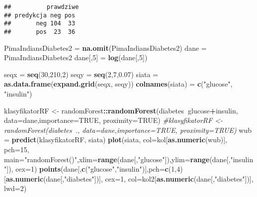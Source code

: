 \documentclass[polish,]{book}
\newenvironment{Shaded}{\begin{snugshade}}{\end{snugshade}}
\newcommand{\CommentTok}[1]{\textcolor[rgb]{0.56,0.35,0.01}{\textit{#1}}}
\newcommand{\DataTypeTok}[1]{\textcolor[rgb]{0.13,0.29,0.53}{#1}}
\newcommand{\DecValTok}[1]{\textcolor[rgb]{0.00,0.00,0.81}{#1}}
\newcommand{\FloatTok}[1]{\textcolor[rgb]{0.00,0.00,0.81}{#1}}
\newcommand{\KeywordTok}[1]{\textcolor[rgb]{0.13,0.29,0.53}{\textbf{#1}}}
\newcommand{\NormalTok}[1]{#1}
\newcommand{\OperatorTok}[1]{\textcolor[rgb]{0.81,0.36,0.00}{\textbf{#1}}}
\newcommand{\OtherTok}[1]{\textcolor[rgb]{0.56,0.35,0.01}{#1}}
\newcommand{\StringTok}[1]{\textcolor[rgb]{0.31,0.60,0.02}{#1}}
\begin{document}
\begin{verbatim}
##          prawdziwe
## predykcja neg pos
##       neg 104  33
##       pos  23  36
\end{verbatim}

\begin{Shaded}
\begin{Highlighting}[]
\NormalTok{PimaIndiansDiabetes2 =}\StringTok{ }\KeywordTok{na.omit}\NormalTok{(PimaIndiansDiabetes2)}
\NormalTok{dane =}\StringTok{ }\NormalTok{PimaIndiansDiabetes2}
\NormalTok{dane[,}\DecValTok{5}\NormalTok{] =}\StringTok{ }\KeywordTok{log}\NormalTok{(dane[,}\DecValTok{5}\NormalTok{])}

\NormalTok{seqx =}\StringTok{ }\KeywordTok{seq}\NormalTok{(}\DecValTok{30}\NormalTok{,}\DecValTok{210}\NormalTok{,}\DecValTok{2}\NormalTok{)}
\NormalTok{seqy =}\StringTok{ }\KeywordTok{seq}\NormalTok{(}\DecValTok{2}\NormalTok{,}\DecValTok{7}\NormalTok{,}\FloatTok{0.07}\NormalTok{)}
\NormalTok{siata =}\StringTok{ }\KeywordTok{as.data.frame}\NormalTok{(}\KeywordTok{expand.grid}\NormalTok{(seqx, seqy))}
\KeywordTok{colnames}\NormalTok{(siata) =}\StringTok{ }\KeywordTok{c}\NormalTok{(}\StringTok{"glucose"}\NormalTok{, }\StringTok{"insulin"}\NormalTok{)}

\NormalTok{klasyfikatorRF <-}\StringTok{ }\NormalTok{randomForest}\OperatorTok{::}\KeywordTok{randomForest}\NormalTok{(diabetes}\OperatorTok{~}\NormalTok{glucose}\OperatorTok{+}\NormalTok{insulin,}
                                             \DataTypeTok{data=}\NormalTok{dane,}\DataTypeTok{importance=}\OtherTok{TRUE}\NormalTok{, }\DataTypeTok{proximity=}\OtherTok{TRUE}\NormalTok{)}
\CommentTok{#klasyfikatorRF <- randomForest(diabetes~., data=dane,importance=TRUE, proximity=TRUE)}
\NormalTok{wub =}\StringTok{ }\KeywordTok{predict}\NormalTok{(klasyfikatorRF, siata)}
\KeywordTok{plot}\NormalTok{(siata, }\DataTypeTok{col=}\NormalTok{kol[}\KeywordTok{as.numeric}\NormalTok{(wub)], }\DataTypeTok{pch=}\DecValTok{15}\NormalTok{, }
     \DataTypeTok{main=}\StringTok{"randomForest()"}\NormalTok{,}\DataTypeTok{xlim=}\KeywordTok{range}\NormalTok{(dane[,}\StringTok{"glucose"}\NormalTok{]),}\DataTypeTok{ylim=}\KeywordTok{range}\NormalTok{(dane[,}\StringTok{"insulin"}\NormalTok{]),}
     \DataTypeTok{cex=}\DecValTok{1}\NormalTok{)}
\KeywordTok{points}\NormalTok{(dane[,}\KeywordTok{c}\NormalTok{(}\StringTok{"glucose"}\NormalTok{,}\StringTok{"insulin"}\NormalTok{)],}\DataTypeTok{pch=}\KeywordTok{c}\NormalTok{(}\DecValTok{1}\NormalTok{,}\DecValTok{4}\NormalTok{)[}\KeywordTok{as.numeric}\NormalTok{(dane[,}\StringTok{"diabetes"}\NormalTok{])], }
       \DataTypeTok{cex=}\DecValTok{1}\NormalTok{, }\DataTypeTok{col=}\NormalTok{kol2[}\KeywordTok{as.numeric}\NormalTok{(dane[,}\StringTok{"diabetes"}\NormalTok{])], }\DataTypeTok{lwd=}\DecValTok{2}\NormalTok{)}
\end{Highlighting}
\end{Shaded}
\end{document}
